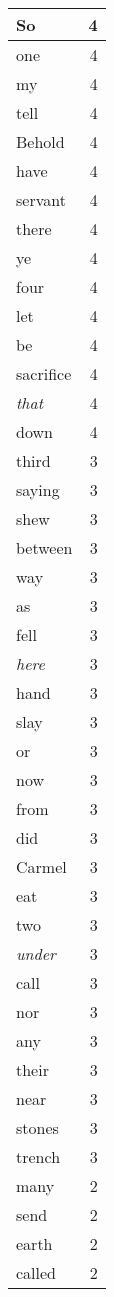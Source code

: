 \begin{center}
\begin{longtable}{l|r}
So & 4\\ \hline 
one & 4\\ \hline 
my & 4\\ \hline 
tell & 4\\ \hline 
Behold & 4\\ \hline 
have & 4\\ \hline 
servant & 4\\ \hline 
there & 4\\ \hline 
ye & 4\\ \hline 
four & 4\\ \hline 
let & 4\\ \hline 
be & 4\\ \hline 
sacrifice & 4\\ \hline 
\emph{that} & 4\\ \hline 
down & 4\\ \hline 
third & 3\\ \hline 
saying & 3\\ \hline 
shew & 3\\ \hline 
between & 3\\ \hline 
way & 3\\ \hline 
as & 3\\ \hline 
fell & 3\\ \hline 
\emph{here} & 3\\ \hline 
hand & 3\\ \hline 
slay & 3\\ \hline 
or & 3\\ \hline 
now & 3\\ \hline 
from & 3\\ \hline 
did & 3\\ \hline 
Carmel & 3\\ \hline 
eat & 3\\ \hline 
two & 3\\ \hline 
\emph{under} & 3\\ \hline 
call & 3\\ \hline 
nor & 3\\ \hline 
any & 3\\ \hline 
their & 3\\ \hline 
near & 3\\ \hline 
stones & 3\\ \hline 
trench & 3\\ \hline 
many & 2\\ \hline 
send & 2\\ \hline 
earth & 2\\ \hline 
called & 2\\ \hline 

\end{longtable}
\end{center}
